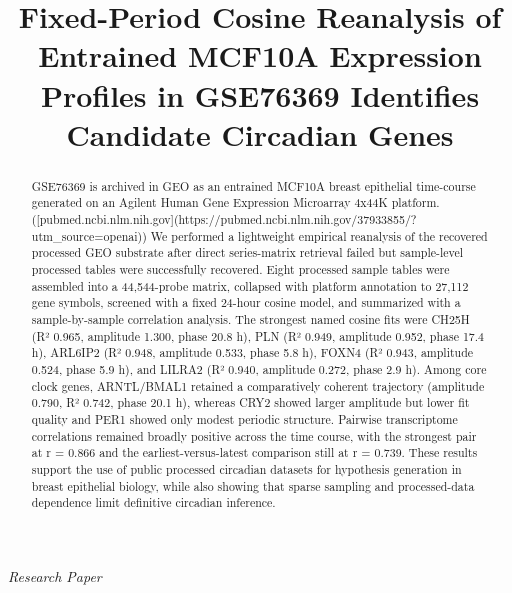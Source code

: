 \documentclass[11pt]{article}
\title{Fixed-Period Cosine Reanalysis of Entrained MCF10A Expression Profiles in GSE76369 Identifies Candidate Circadian Genes}
\author{}
\date{}
\begin{document}
\maketitle

\begin{center}\small\textit{Research Paper}\end{center}

\begin{abstract}

GSE76369 is archived in GEO as an entrained MCF10A breast epithelial time-course generated on an Agilent Human Gene Expression Microarray 4x44K platform. ([pubmed.ncbi.nlm.nih.gov](https://pubmed.ncbi.nlm.nih.gov/37933855/?utm\_source=openai)) We performed a lightweight empirical reanalysis of the recovered processed GEO substrate after direct series-matrix retrieval failed but sample-level processed tables were successfully recovered. Eight processed sample tables were assembled into a 44,544-probe matrix, collapsed with platform annotation to 27,112 gene symbols, screened with a fixed 24-hour cosine model, and summarized with a sample-by-sample correlation analysis. The strongest named cosine fits were CH25H (R² 0.965, amplitude 1.300, phase 20.8 h), PLN (R² 0.949, amplitude 0.952, phase 17.4 h), ARL6IP2 (R² 0.948, amplitude 0.533, phase 5.8 h), FOXN4 (R² 0.943, amplitude 0.524, phase 5.9 h), and LILRA2 (R² 0.940, amplitude 0.272, phase 2.9 h). Among core clock genes, ARNTL/BMAL1 retained a comparatively coherent trajectory (amplitude 0.790, R² 0.742, phase 20.1 h), whereas CRY2 showed larger amplitude but lower fit quality and PER1 showed only modest periodic structure. Pairwise transcriptome correlations remained broadly positive across the time course, with the strongest pair at r = 0.866 and the earliest-versus-latest comparison still at r = 0.739. These results support the use of public processed circadian datasets for hypothesis generation in breast epithelial biology, while also showing that sparse sampling and processed-data dependence limit definitive circadian inference.

\end{abstract}
\end{document}
